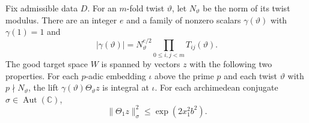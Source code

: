 \begin{lemma}
\label{lem:c-auxiliary-forms}
\emitthmsource
Fix admissible data $D$. For an $m$-fold twist $\vartheta$, let $N_\vartheta$ be the norm of its twist modulus. There are an integer $e$ and a family of nonzero scalars $\gamma(\vartheta)$ with $\gamma(1)=1$ and
\[
 |\gamma(\vartheta)|
 =N_\vartheta^{e/2}\prod_{0\le i,j<m}T_{ij}(\vartheta).
\]
The good target space $W$ is spanned by vectors $z$ with the following two properties. For each $p$-adic embedding $\iota$ above the prime $p$ and each twist $\vartheta$ with $p\nmid N_\vartheta$, the lift $\gamma(\vartheta)\Theta_\vartheta z$ is integral at $\iota$. For each archimedean conjugate $\sigma\in\operatorname{Aut}(\mathbb C)$,
\[
 \|\Theta_1 z\|_\sigma^2\le \exp(2x_1^2b^2).
\]
\end{lemma}
